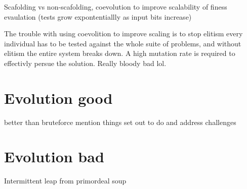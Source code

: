 Scafolding vs non-scafolding, coevolution to improve scalability of finess evaulation (tests grow expontentiallly as input bits increase)

The trouble with using coevolition to improve scaling is to stop elitism
every individual has to be tested against the whole suite of problems, and
without elitism the entire system breaks down. A high mutation rate is required
to effectivly persue the solution. Really bloody bad lol.

\section{Evolution good}
better than bruteforce
mention things set out to do and address challenges

\section{Evolution bad}
Intermittent leap from primordeal soup
